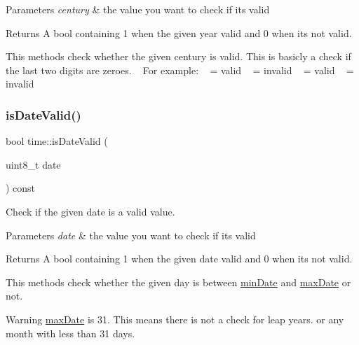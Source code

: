 \begin{DoxyParams}{Parameters}
{\em century} & the value you want to check if it\textquotesingle{}s valid \\
\hline
\end{DoxyParams}
\begin{DoxyReturn}{Returns}
A bool containing 1 when the given year valid and 0 when it\textquotesingle{}s not valid.
\end{DoxyReturn}
This methods check whether the given century is valid. This is basicly a check if the last two digits are zeroes. ~\newline
 For example\+: ~ = valid ~ = invalid ~ = valid ~ = invalid ~\newline
 \mbox{\label{classtime_aa678e8f53a12adda2f807e6a44ebc46d}} 
\subsubsection{\texorpdfstring{is\+Date\+Valid()}{isDateValid()}}
{\footnotesize\ttfamily bool time\+::is\+Date\+Valid (\begin{DoxyParamCaption}\item[{uint8\+\_\+t}]{date }\end{DoxyParamCaption}) const}



Check if the given date is a valid value. 


\begin{DoxyParams}{Parameters}
{\em date} & the value you want to check if it\textquotesingle{}s valid \\
\hline
\end{DoxyParams}
\begin{DoxyReturn}{Returns}
A bool containing 1 when the given date valid and 0 when it\textquotesingle{}s not valid.
\end{DoxyReturn}
This methods check whether the given day is between \mbox{\hyperlink{}{min\+Date}} and \mbox{\hyperlink{}{max\+Date}} or not. \begin{DoxyWarning}{Warning}
\mbox{\hyperlink{}{max\+Date}} is 31. This means there is not a check for leap years. or any month with less than 31 days. 
\end{DoxyWarning}
\mbox{\label{classtime_a126cf22d6b3a7a36603e2cb390082d2f}} 
